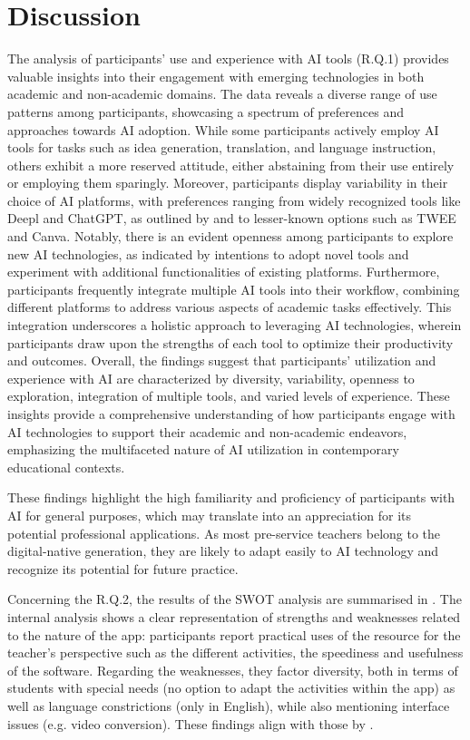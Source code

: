 \section{Discussion}\label{sec-discussion}
The analysis of participants' use and experience with
AI tools (R.Q.1) provides valuable insights into their engagement with
emerging technologies in both academic and non-academic domains. The
data reveals a diverse range of use patterns among participants,
showcasing a spectrum of preferences and approaches towards AI adoption.
While some participants actively employ AI tools for tasks such as idea
generation, translation, and language instruction, others exhibit a more
reserved attitude, either abstaining from their use entirely or
employing them sparingly. Moreover, participants display variability in
their choice of AI platforms, with preferences ranging from widely
recognized tools like Deepl and ChatGPT, as outlined by \textcite{schmidt2022} and to lesser-known options such as TWEE and Canva.
Notably, there is an evident openness among participants to explore new
AI technologies, as indicated by intentions to adopt novel tools and
experiment with additional functionalities of existing platforms.
Furthermore, participants frequently integrate multiple AI tools into
their workflow, combining different platforms to address various aspects
of academic tasks effectively. This integration underscores a holistic
approach to leveraging AI technologies, wherein participants draw upon
the strengths of each tool to optimize their productivity and outcomes.
Overall, the findings suggest that participants'
utilization and experience with AI are characterized by diversity,
variability, openness to exploration, integration of multiple tools, and
varied levels of experience. These insights provide a comprehensive
understanding of how participants engage with AI technologies to support
their academic and non-academic endeavors, emphasizing the multifaceted
nature of AI utilization in contemporary educational contexts.

These findings highlight the high familiarity and proficiency of
participants with AI for general purposes, which may translate into an
appreciation for its potential professional applications. As most
pre-service teachers belong to the digital-native generation, they are
likely to adapt easily to AI technology and recognize its potential for
future practice.

Concerning the R.Q.2, the results of the SWOT analysis are summarised in
. The internal analysis shows a clear representation of strengths
and weaknesses related to the nature of the app: participants report
practical uses of the resource for the teacher's perspective such as the
different activities, the speediness and usefulness of the software.
Regarding the weaknesses, they factor diversity, both in terms of
students with special needs (no option to adapt the activities within
the app) as well as language constrictions (only in English), while also
mentioning interface issues (e.g. video conversion). These findings
align with those by \textcite{ravshanovna2023}.


